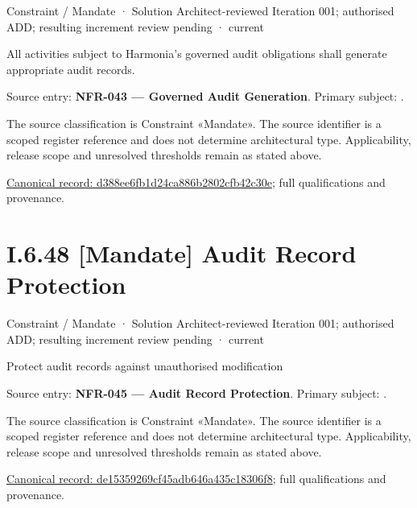 \label{element:d388ee6fb1d24ca886b2802cfb42c30e}
{\small Constraint / Mandate · Solution Architect-reviewed Iteration 001; authorised ADD; resulting increment review pending · current}\par

All activities subject to Harmonia's governed audit obligations shall generate appropriate audit records.



Source entry: \textbf{NFR-043 — Governed Audit Generation}. Primary subject: \texttt{}.



The source classification is Constraint «Mandate». The source identifier is a scoped register reference and does not determine architectural type. Applicability, release scope and unresolved thresholds remain as stated above.


{\footnotesize \href{../../../../continuum/motivation/constraint/mandate/d388ee6fb1d24ca886b2802cfb42c30e.md}{Canonical record: d388ee6fb1d24ca886b2802cfb42c30e}; full qualifications and provenance.}\par
\section*{I.6.48 [Mandate] Audit Record Protection}
\label{navigation:I.6.48}

\label{element:de15359269cf45adb646a435c18306f8}
{\small Constraint / Mandate · Solution Architect-reviewed Iteration 001; authorised ADD; resulting increment review pending · current}\par

Protect audit records against unauthorised modification



Source entry: \textbf{NFR-045 — Audit Record Protection}. Primary subject: \texttt{}.



The source classification is Constraint «Mandate». The source identifier is a scoped register reference and does not determine architectural type. Applicability, release scope and unresolved thresholds remain as stated above.


{\footnotesize \href{../../../../continuum/motivation/constraint/mandate/de15359269cf45adb646a435c18306f8.md}{Canonical record: de15359269cf45adb646a435c18306f8}; full qualifications and provenance.}\par
